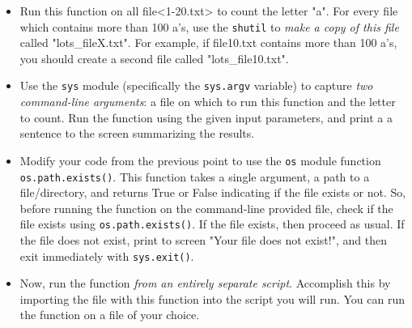 \documentclass{article}[12pt]
\newcommand{\code}[1]{\texttt{#1}}  %
\begin{document}
\begin{enumerate}
	\begin{itemize}
		\item Run this function on all file<1-20.txt> to count the letter "a". For every file which contains more than 100 a's, use the \code{shutil} to \emph{make a copy of this file} called "lots\_fileX.txt". For example, if file10.txt contains more than 100 a's, you should create a second file called "lots\_file10.txt". 
		\item Use the \code{sys} module (specifically the \code{sys.argv} variable) to capture \emph{two command-line arguments}: a file on which to run this function and the letter to count. Run the function using the given input parameters, and print a a sentence to the screen summarizing the results.
		\item Modify your code from the previous point to use the \code{os} module function \code{os.path.exists()}. This function takes a single argument, a path to a file/directory, and returns True or False indicating if the file exists or not. So, before running the function on the command-line provided file, check if the file exists using \code{os.path.exists()}. If the file exists, then proceed as usual. If the file does not exist, print to screen "Your file does not exist!", and then exit immediately with \code{sys.exit()}.
		\item Now, run the function \emph{from an entirely separate script}. Accomplish this by importing the file with this function into the script you will run. You can run the function on a file of your choice.
	\end{itemize}


\end{enumerate}




\end{document}
